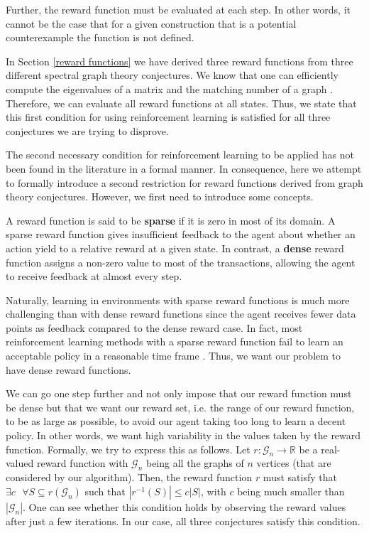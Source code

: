 \documentclass[11pt]{article}
\theoremstyle{definition}
\begin{document}
Further, the reward function must be evaluated at each step. In other words, it cannot be the case that for a given construction that is a potential counterexample the function is not defined. 

In Section \ref{reward functions} we have derived three reward functions from three different spectral graph theory conjectures. 
We know that one can efficiently compute the eigenvalues of a matrix \cite{qr_algorithm} and the matching number of a graph \cite{matching_efficient}. Therefore, we can evaluate all reward functions at all states. Thus, we state that this first condition for using reinforcement learning is satisfied for all three conjectures we are trying to disprove.

The second necessary condition for reinforcement learning to be applied has not been found in the literature in a formal manner. In consequence, here we attempt to formally introduce a second restriction for reward functions derived from graph theory conjectures. However, we first need to introduce some concepts. 

A reward function is said to be \textbf{sparse} if it is zero in most of its domain. A sparse reward function gives insufficient feedback to the agent about whether an action yield to a relative reward at a given state. In contrast, a \textbf{dense} reward function assigns a non-zero value to most of the transactions, allowing the agent to receive feedback at almost every step.

Naturally, learning in environments with sparse reward functions is much more challenging than with dense reward functions since the agent receives fewer data points as feedback compared to the dense reward case. In fact, most reinforcement learning methods with a sparse reward function fail to learn an acceptable policy in a reasonable time frame \cite{sparse}. Thus, we want our problem to have dense reward functions. 

We can go one step further and not only impose that our reward function must be dense but that we want our reward set, i.e. the range of our reward function, to be as large as possible, to avoid our agent taking too long to learn a decent policy. In other words, we want high variability in the values taken by the reward function. Formally, we try to express this as follows. Let $r: \mathcal{G}_n \rightarrow \mathbb{R}$ be a real-valued reward function with $\mathcal{G}_n$ being all the graphs of $n$ vertices (that are considered by our algorithm). Then, the reward function $r$ must satisfy that $\exists c \text{ } \forall S \subseteq r(\mathcal{G}_n)$ such that $|r^{-1}(S)| \leq c|S|$, with $c$ being much smaller than $|\mathcal{G}_n|$. One can see whether this condition holds by observing the reward values after just a few iterations. In our case, all three conjectures satisfy this condition.
\end{document}

